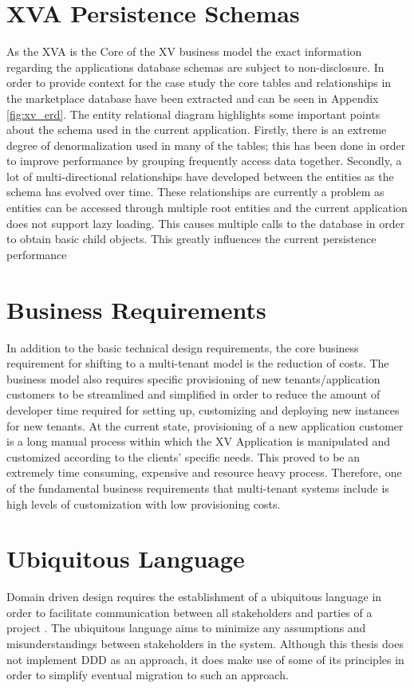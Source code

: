 \section{XVA Persistence Schemas}

As the XVA is the Core of the XV business model the exact information regarding the applications database schemas are subject to non-disclosure. In order to provide context for the case study the core tables and relationships in the marketplace database have been extracted and can be seen in Appendix \ref{fig:xv_erd}. The entity relational diagram highlights some important points about the schema used in the current application. Firstly, there is an extreme degree of denormalization used in many of the tables; this has been done in order to improve performance by grouping frequently access data together. Secondly, a lot of multi-directional relationships have developed between the entities as the schema has evolved over time. These relationships are currently a problem as entities can be accessed through multiple root entities and the current application does not support lazy loading. This causes multiple calls to the database in order to obtain basic child objects. This greatly influences the current persistence performance



\section{Business Requirements}

In addition to the basic technical design requirements, the core business requirement for shifting to a multi-tenant model is the reduction of costs. The business model also requires specific provisioning of new tenants/application customers to be streamlined and simplified in order to reduce the amount of developer time required for setting up, customizing and deploying new instances for new tenants. At the current state, provisioning of a new application customer is a long manual process within which the XV Application is manipulated and customized according to the clients' specific needs. This proved to be an extremely time consuming, expensive and resource heavy process. Therefore, one of the fundamental business requirements that multi-tenant systems include is high levels of customization with low provisioning costs.

\section{Ubiquitous Language}
Domain driven design requires the establishment of a ubiquitous language in order to facilitate communication between all stakeholders and parties of a project \cite{Evans2003}. The ubiquitous language aims to minimize any assumptions and misunderstandings between stakeholders in the system.  Although this thesis does not implement DDD as an approach, it does make use of some of its principles in order to simplify eventual migration to such an approach.

